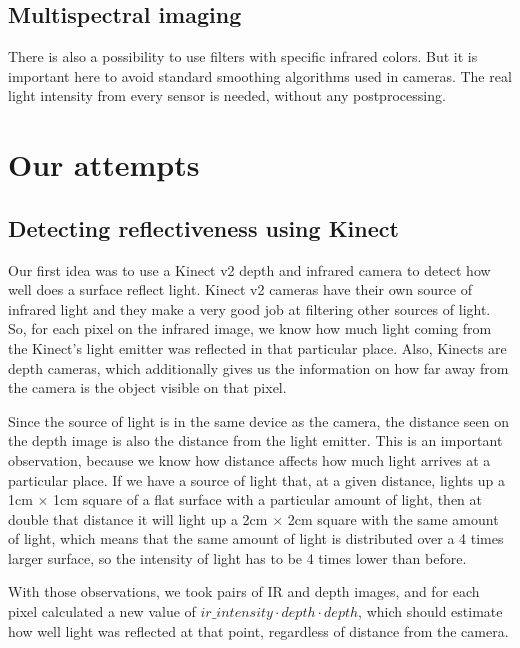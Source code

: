         \subsection*{Multispectral imaging}
            There is also a possibility to use filters with specific infrared colors.
            But it is important here to avoid standard smoothing algorithms used
            in cameras.
            The real light intensity from every sensor is needed,
            without any postprocessing.

    \section{Our attempts}

        \subsection{Detecting reflectiveness using Kinect}
            Our first idea was to use a Kinect v2 depth and infrared camera to detect
            how well does a surface reflect light.
            Kinect v2 cameras have their own source of infrared light and they make
            a very good job at filtering other sources of light.
            So, for each pixel on the infrared image, we know how much light coming
            from the Kinect's light emitter was reflected in that particular place.
            Also, Kinects are depth cameras, which additionally gives us the information
            on how far away from the camera is the object visible on that pixel.

            Since the source of light is in the same device as the camera, the distance
            seen on the depth image is also the distance from the light emitter.
            This is an important observation, because we know how distance affects how
            much light arrives at a particular place. %
            If we have a source of light that, at a given distance, lights up a
            1cm $\times$ 1cm square of a flat surface with a particular amount
            of light, then at double that distance it will light up a 2cm $\times$ 2cm
            square with the same amount of light, which means that the same amount
            of light is distributed over a 4 times larger surface, so the
            intensity of light has to be 4 times lower than before.

            With those observations, we took pairs of IR and depth images, and for each
            pixel calculated a new value of $ir\_intensity \cdot depth \cdot depth$,
            which should estimate how well light was reflected at that point,
            regardless of distance from the camera.

